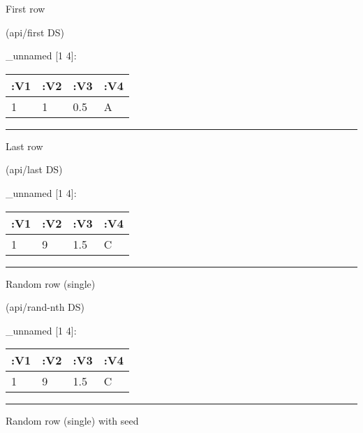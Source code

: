 \documentclass[]{article}
\newenvironment{Shaded}{\begin{snugshade}}{\end{snugshade}}
\newcommand{\NormalTok}[1]{#1}
\begin{document}
First row

\begin{Shaded}
\begin{Highlighting}[]
\NormalTok{(api/first DS)}
\end{Highlighting}
\end{Shaded}

\_unnamed {[}1 4{]}:

\begin{longtable}[]{@{}llll@{}}
\toprule
:V1 & :V2 & :V3 & :V4\tabularnewline
\midrule
\endhead
1 & 1 & 0.5 & A\tabularnewline
\bottomrule
\end{longtable}

\begin{center}\rule{0.5\linewidth}{0.5pt}\end{center}

Last row

\begin{Shaded}
\begin{Highlighting}[]
\NormalTok{(api/last DS)}
\end{Highlighting}
\end{Shaded}

\_unnamed {[}1 4{]}:

\begin{longtable}[]{@{}llll@{}}
\toprule
:V1 & :V2 & :V3 & :V4\tabularnewline
\midrule
\endhead
1 & 9 & 1.5 & C\tabularnewline
\bottomrule
\end{longtable}

\begin{center}\rule{0.5\linewidth}{0.5pt}\end{center}

Random row (single)

\begin{Shaded}
\begin{Highlighting}[]
\NormalTok{(api/rand-nth DS)}
\end{Highlighting}
\end{Shaded}

\_unnamed {[}1 4{]}:

\begin{longtable}[]{@{}llll@{}}
\toprule
:V1 & :V2 & :V3 & :V4\tabularnewline
\midrule
\endhead
1 & 9 & 1.5 & C\tabularnewline
\bottomrule
\end{longtable}

\begin{center}\rule{0.5\linewidth}{0.5pt}\end{center}

Random row (single) with seed
\end{document}
